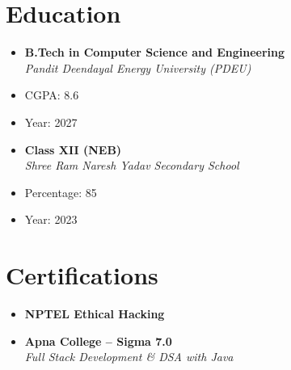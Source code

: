 \documentclass[11pt,a4paper]{article}
\begin{document}
\section*{Education}
\begin{itemize}[noitemsep,topsep=0pt]
\item \textbf{B.Tech in Computer Science and Engineering} \\
\textit{Pandit Deendayal Energy University (PDEU)} \\
\item CGPA: 8.6
\item Year: 2027
\item \textbf{Class XII (NEB)} \\
\textit{Shree Ram Naresh Yadav Secondary School} \\
\item Percentage: 85%
\item Year: 2023
\end{itemize}

\section*{Certifications}
\begin{itemize}[noitemsep,topsep=0pt]
\item \textbf{NPTEL Ethical Hacking} \\
\item \textbf{Apna College – Sigma 7.0} \\
\textit{Full Stack Development & DSA with Java} \\
\end{itemize}
\end{document}
